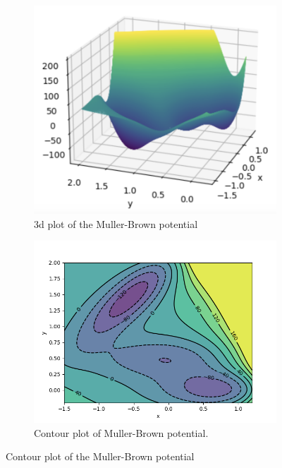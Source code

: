 \documentclass{article}
\theoremstyle{mystyle}
\begin{document}
    \begin{figure}[H]
\begin{subfigure}{0.5\textwidth}
  \centering
  \includegraphics[width=\linewidth]{images/MullerB-potential-plot-3d.png}
  \caption{3d plot of the Muller-Brown potential}
  \label{fig: muller-brown 3d}
\end{subfigure}%
\begin{subfigure}{0.5\textwidth}
  \centering
  \includegraphics[width=\linewidth]{images/MullerB-contour-with-grad-field.png}
  \caption{Contour plot of Muller-Brown potential.}
  \label{fig:  muller-brown contour}
\end{subfigure}
\caption{Contour plot of the Muller-Brown potential}
\label{fig:  muller-brown plots}
\end{figure}
\end{document}
